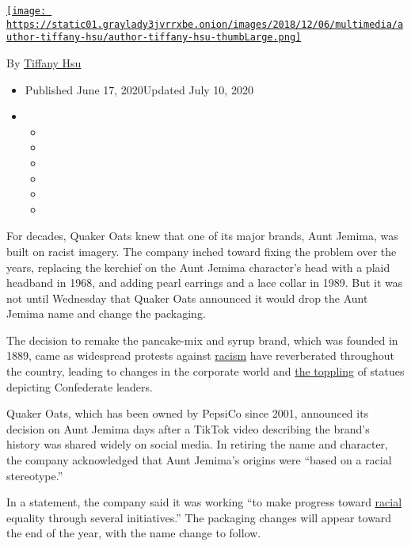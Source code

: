 \href{https://www.nytimes3xbfgragh.onion/by/tiffany-hsu}{\texttt{[image: https://static01.graylady3jvrrxbe.onion/images/2018/12/06/multimedia/author-tiffany-hsu/author-tiffany-hsu-thumbLarge.png]}}

By \href{https://www.nytimes3xbfgragh.onion/by/tiffany-hsu}{Tiffany Hsu}

\begin{itemize}
\item
  Published June 17, 2020Updated July 10, 2020
\item
  \begin{itemize}
  \item
  \item
  \item
  \item
  \item
  \item
  \end{itemize}
\end{itemize}

For decades, Quaker Oats knew that one of its major brands, Aunt Jemima,
was built on racist imagery. The company inched toward fixing the
problem over the years, replacing the kerchief on the Aunt Jemima
character's head with a plaid headband in 1968, and adding pearl
earrings and a lace collar in 1989. But it was not until Wednesday that
Quaker Oats announced it would drop the Aunt Jemima name and change the
packaging.

The decision to remake the pancake-mix and syrup brand, which was
founded in 1889, came as widespread protests against
\href{https://www.nytimes3xbfgragh.onion/2020/07/10/sports/football/washington-redskins-name-change-mascots.html}{racism}
have reverberated throughout the country, leading to changes in the
corporate world and
\href{https://www.nytimes3xbfgragh.onion/2020/06/11/us/Jefferson-Davis-Statue-Richmond.html}{the
toppling} of statues depicting Confederate leaders.

Quaker Oats, which has been owned by PepsiCo since 2001, announced its
decision on Aunt Jemima days after a TikTok video describing the brand's
history was shared widely on social media. In retiring the name and
character, the company acknowledged that Aunt Jemima's origins were
``based on a racial stereotype.''

In a statement, the company said it was working ``to make progress
toward
\href{https://www.nytimes3xbfgragh.onion/2020/07/10/sports/football/washington-redskins-name-change-mascots.html}{racial}
equality through several initiatives.'' The packaging changes will
appear toward the end of the year, with the name change to follow.

